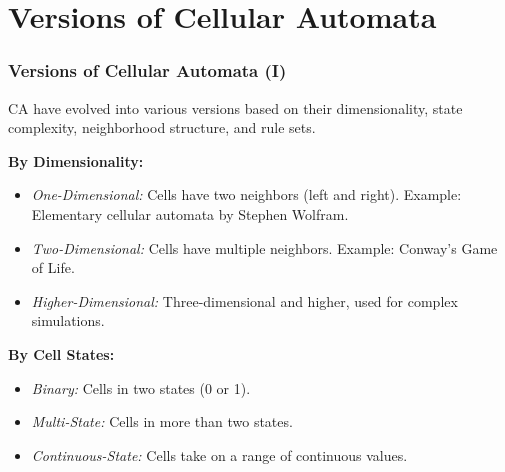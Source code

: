 \documentclass{beamer}
\begin{document}
\section{Versions of Cellular Automata}
\begin{frame}
    \frametitle{Versions of Cellular Automata (I)}
    CA have evolved into various versions based on their dimensionality, state complexity, neighborhood structure, and rule sets.

    \textbf{By Dimensionality:}
    \begin{itemize}
        \item \textit{One-Dimensional:} Cells have two neighbors (left and right). Example: Elementary cellular automata by Stephen Wolfram.
        \item \textit{Two-Dimensional:} Cells have multiple neighbors. Example: Conway’s Game of Life.
        \item \textit{Higher-Dimensional:} Three-dimensional and higher, used for complex simulations.
    \end{itemize}
    \textbf{By Cell States:}
    \begin{itemize}
        \item \textit{Binary:} Cells in two states (0 or 1).
        \item \textit{Multi-State:} Cells in more than two states.
        \item \textit{Continuous-State:} Cells take on a range of continuous values.
    \end{itemize}
\end{frame}
\end{document}
